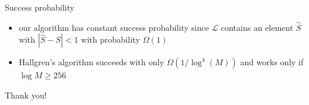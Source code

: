 \documentclass[slideColor]{prosper}
\renewcommand{\>}{\rangle}
\newcommand{\<}{\langle}
\begin{document}

\begin{slide}{Success probability}

\begin{itemize}
\item our algorithm has constant success probability since $\mathcal{L}$ contains an element $\hat{S}$ with $|\hat{S}-S|<1$ with probability $\Omega(1)$ 

\medskip
\item Hallgren's algorithm succeeds with only $\Omega(1/\log^4(M))$ and works only if $\log M \ge 256$
\end{itemize}
\end{slide}


\begin{slide}{Thank you!}

\end{slide}
\end{document}
